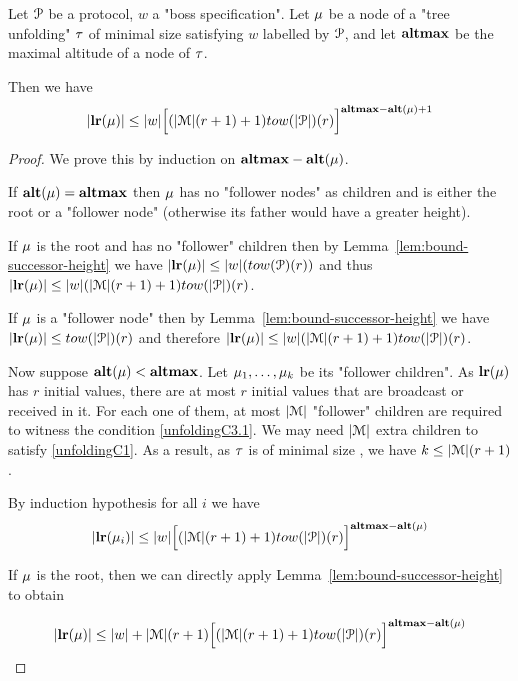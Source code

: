\begin{lemma}
	\label{lem:bound-length-at-height-h}
	Let $\mathcal{P}$ be a protocol, $w$ a "boss specification".
	Let $\mu$ be a node of a "tree unfolding" $\tau$ of minimal size satisfying $w$ labelled by $\mathcal{P}$, and let $\mathbf{altmax}$ be the maximal altitude of a node of $\tau$.
	
	Then we have 
	\[
		\size{\localrunlabel{\node}} \leq \size{w} \Big[(\size{\messages}(r+1)+1) \towerfun(\size{\prot})(r)\Big]^{\altmax-\altitude{\node}+1}
	\] 
\end{lemma}

\ifproofs
\begin{proof}
	We prove this by induction on $\mathbf{altmax}-\mathbf{alt(\mu)}$.
	
	If $\mathbf{alt(\mu)} = \mathbf{altmax}$ then $\mu$ has no "follower nodes" as children and is either the root or a "follower node" (otherwise its father would have a greater height).
	
	If $\mu$ is the root and has no "follower" children then by Lemma~\ref{lem:bound-successor-height} we have $\size{\localrunlabel{\node}} \leq \size{w}(\towerfun(\prot)(r))$ and thus $\size{\localrunlabel{\node}} \leq \size{w}(\size{\messages}(r+1)+1) \towerfun(\size{\prot})(r)$.
	
	If $\mu$ is a "follower node" then by Lemma~\ref{lem:bound-successor-height} we have 
	$\size{\localrunlabel{\node}} \leq \towerfun(\size{\prot})(r)$ and therefore $\size{\localrunlabel{\node}} \leq \size{w}(\size{\messages}(r+1)+1) \towerfun(\size{\prot})(r)$.
	
	Now suppose $\mathbf{alt(\mu)} < \mathbf{altmax}$. Let $\mu_1, \ldots, \mu_k$ be its "follower children". 
	As $\mathbf{lr}(\mu)$ has $r$ initial values, there are at most $r$ initial values that are broadcast or received in it.
	For each one of them, at most $|\mathcal{M}|$ "follower" children are required to witness the condition \ref{unfoldingC3.1}.
	We may need $|\mathcal{M}|$ extra children to satisfy \ref{unfoldingC1}.
	As a result, as $\tau$ is of minimal size , we have $k \leq |\mathcal{M}|(r+1)$.
	
	By induction hypothesis for all $i$ we have 
	\[
	\size{\localrunlabel{\node_i}} \leq \size{w} \Big[(\size{\messages}(r+1)+1) \towerfun(\size{\prot})(r)\Big]^{\altmax-\altitude{\node}}
	\]
	
	If $\mu$ is the root, then we can directly apply Lemma~\ref{lem:bound-successor-height} to obtain 
	
	
	\[
	\size{\localrunlabel{\node}} \leq \size{w} + \size{\messages}(r+1) \Big[(\size{\messages}(r+1)+1) \towerfun(\size{\prot})(r)\Big]^{\altmax-\altitude{\node}}
	\]
	
\end{proof}
\fi

